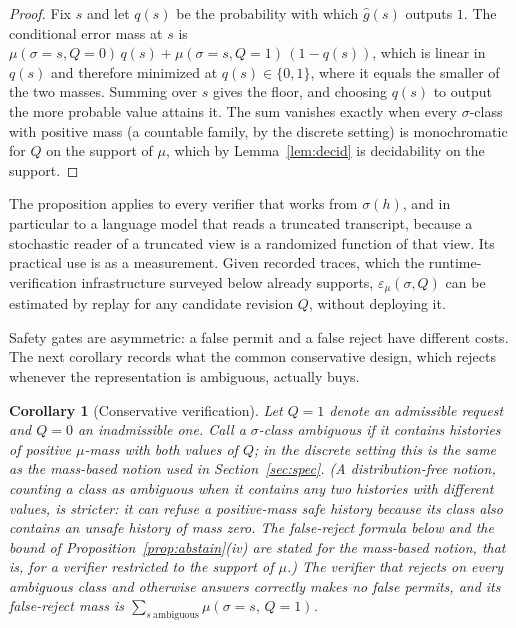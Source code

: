 \documentclass[11pt]{article}
\newtheorem{corollary}{Corollary}
\theoremstyle{definition}
\theoremstyle{remark}
\newcommand{\Bool}{\{0,1\}}
\begin{document}
\begin{proof}
Fix $s$ and let $q(s)$ be the probability with which $\hat g(s)$ outputs $1$. The conditional error mass at $s$ is $\mu(\sigma=s,Q=0)\,q(s)+\mu(\sigma=s,Q=1)\,(1-q(s))$, which is linear in $q(s)$ and therefore minimized at $q(s)\in\Bool$, where it equals the smaller of the two masses. Summing over $s$ gives the floor, and choosing $q(s)$ to output the more probable value attains it. The sum vanishes exactly when every $\sigma$-class with positive mass (a countable family, by the discrete setting) is monochromatic for $Q$ on the support of $\mu$, which by Lemma~\ref{lem:decid} is decidability on the support.
\end{proof}

The proposition applies to every verifier that works from $\sigma(h)$, and in particular to a language model that reads a truncated transcript, because a stochastic reader of a truncated view is a randomized function of that view. Its practical use is as a measurement. Given recorded traces, which the runtime-verification infrastructure surveyed below already supports, $\varepsilon_\mu(\sigma,Q)$ can be estimated by replay for any candidate revision $Q$, without deploying it.

Safety gates are asymmetric: a false permit and a false reject have different costs. The next corollary records what the common conservative design, which rejects whenever the representation is ambiguous, actually buys.

\begin{corollary}[Conservative verification]\label{cor:conservative}
Let $Q=1$ denote an admissible request and $Q=0$ an inadmissible one. Call a $\sigma$-class \emph{ambiguous} if it contains histories of positive $\mu$-mass with both values of $Q$; in the discrete setting this is the same as the mass-based notion used in Section~\ref{sec:spec}. (A distribution-free notion, counting a class as ambiguous when it contains any two histories with different values, is stricter: it can refuse a positive-mass safe history because its class also contains an unsafe history of mass zero. The false-reject formula below and the bound of Proposition~\ref{prop:abstain}(iv) are stated for the mass-based notion, that is, for a verifier restricted to the support of $\mu$.) The verifier that rejects on every ambiguous class and otherwise answers correctly makes no false permits, and its false-reject mass is $\sum_{s\ \mathrm{ambiguous}}\mu(\sigma=s,\,Q=1)$.
\end{corollary}
\end{document}
